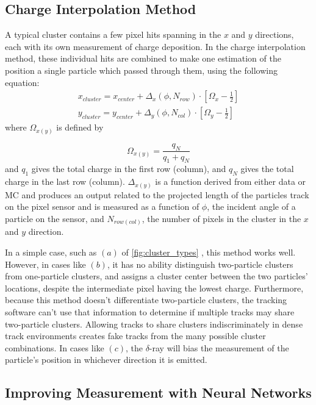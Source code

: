 \subsection{Charge Interpolation Method}

A typical cluster contains a few pixel hits spanning in the $x$ and $y$ directions, each with its own measurement of charge deposition. In the charge interpolation method, these individual hits are combined to make one estimation of the position a single particle which passed through them, using the following equation: 
%
\begin{eqnarray}
x_{cluster} = x_{center} + \Delta_x(\phi,N_{row}) \cdot \left[ \Omega_x -\frac{1}{2} \right] \\
\label{eq:analogx}
y_{cluster} = y_{center} + \Delta_y(\phi,N_{col}) \cdot \left[ \Omega_y -\frac{1}{2} \right]
\label{eq:analogy}
\end{eqnarray}
%
where $\Omega_{x(y)}$ is defined by

\begin{equation}
\Omega_{x(y)} = \frac{q_N}{q_1 + q_N}
\end{equation}
%
and $q_1$ gives the total charge in the first row (column), and $q_N$ gives the total charge in the last row (column). $\Delta_{x(y)}$ is a function derived from either data or \ac{MC} and produces an output related to the projected length of the particles track on the pixel sensor and is measured as a function of $\phi$, the incident angle of a particle on the sensor, and $N_{row(col)}$, the number of pixels in the cluster in the $x$ and $y$ direction. 

In a simple case, such as $(a)$ of \autoref{fig:cluster_types} , this method works well. However, in cases like $(b)$, it has no ability distinguish two-particle clusters from one-particle clusters, and assigns a cluster center between the two particles' locations, despite the intermediate pixel having the lowest charge. Furthermore, because this method doesn't differentiate two-particle clusters, the tracking software can't use that information to determine if multiple tracks may share two-particle clusters. Allowing tracks to share clusters indiscriminately in dense track environments creates fake tracks from the many possible cluster combinations. In cases like $(c)$, the $\delta$-ray will bias the measurement of the particle's position in whichever direction it is emitted. 

\subsection{Improving Measurement with Neural Networks}

